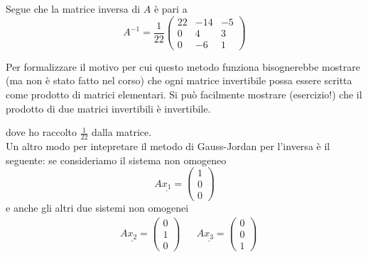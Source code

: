 Segue che la matrice inversa di $A$ è pari a
$$
  A^{-1} = \frac{1}{22} \begin{pmatrix}
    22 & -14 & -5 \\
    0 & 4 & 3 \\
    0 & -6 & 1
  \end{pmatrix}
$$
\begin{remark}
  Per formalizzare il motivo per cui questo metodo funziona bisognerebbe mostrare (ma non è stato fatto nel corso) che ogni matrice invertibile
  possa essere scritta come prodotto di matrici elementari. Si può facilmente mostrare (esercizio!) che il prodotto di due matrici invertibili è invertibile.
\end{remark}
dove ho raccolto $\frac{1}{22}$ dalla matrice. \\
Un altro modo per intepretare il metodo di Gauss-Jordan per l'inversa è il seguente: se consideriamo il sistema non omogeneo
$$
  A\underline{x_1} = \begin{pmatrix}
    1 \\ 0 \\ 0
  \end{pmatrix}
$$
e anche gli altri due sistemi non omogenei
\begin{align}
  &A\underline{x_2} = \begin{pmatrix}
    0 \\ 1 \\ 0
  \end{pmatrix} & &A\underline{x_3} = \begin{pmatrix}
    0 \\ 0 \\ 1
  \end{pmatrix}
\end{align}


